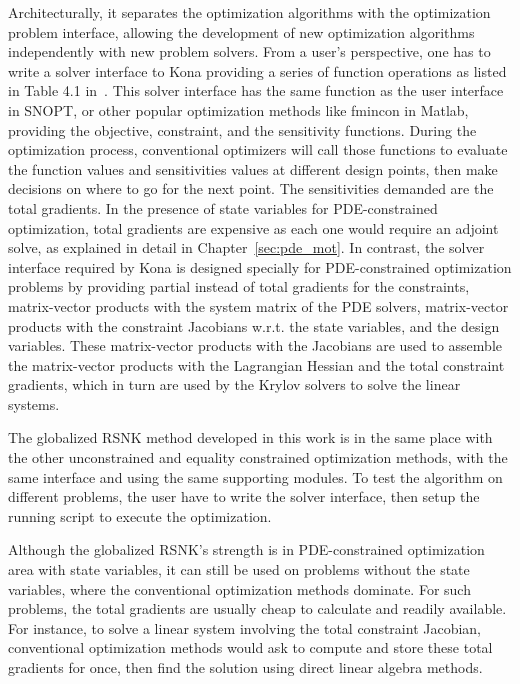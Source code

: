 Architecturally, it separates the optimization algorithms with the optimization 
problem interface, allowing the development of new optimization algorithms independently with 
new problem solvers. From a user's perspective, one has to write a solver interface to Kona providing 
a series of function operations as listed in Table 4.1 in~\cite{dener_thesis_2017}. This solver interface 
has the same function as the user interface in SNOPT, or other popular optimization methods like fmincon in Matlab, 
providing the objective, constraint, and the sensitivity functions. During the optimization process, 
conventional optimizers will call those functions to evaluate the function values and sensitivities 
values at different design points, then make decisions on where to go for the next point. 
The sensitivities demanded are the total gradients. In the presence of state variables for 
PDE-constrained optimization, total gradients are expensive as each one would require an adjoint solve, 
as explained in detail in Chapter~\ref{sec:pde_mot}. In contrast, the solver interface 
required by Kona is designed specially for PDE-constrained optimization problems by providing 
partial instead of total gradients for the constraints, matrix-vector products with the system matrix of 
the PDE solvers, matrix-vector products with the constraint Jacobians w.r.t. the state variables, and the design variables. 
These matrix-vector products 
with the Jacobians are used to assemble the matrix-vector products with the Lagrangian Hessian 
and the total constraint gradients, which in turn are used by the Krylov solvers to solve the linear systems.    

The globalized RSNK method developed in this work is in the same place with the other unconstrained 
and equality constrained optimization methods, with the same interface and using the same supporting 
modules. To test the algorithm on different problems, the user have to write the solver interface, 
then setup the running script to execute the optimization. 

Although the globalized RSNK's strength is in PDE-constrained optimization area with 
state variables, it can still be used on problems without the state variables, where the conventional 
optimization methods dominate.  For such problems, the total gradients are usually cheap to 
calculate and readily available. For instance, to solve a linear system involving the total constraint Jacobian, 
conventional optimization methods would ask to compute and 
store these total gradients for once, then find the solution using direct linear algebra methods. 

